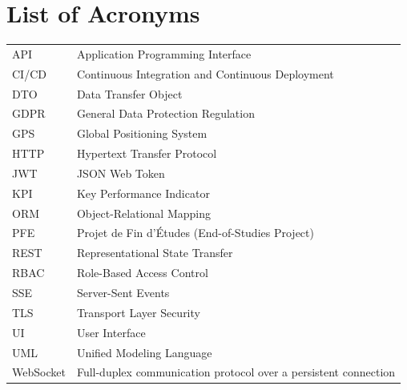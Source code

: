 \chapter*{List of Acronyms}
\begin{longtable}{P{2.7cm}P{11.5cm}}
API & Application Programming Interface\\
CI/CD & Continuous Integration and Continuous Deployment\\
DTO & Data Transfer Object\\
GDPR & General Data Protection Regulation\\
GPS & Global Positioning System\\
HTTP & Hypertext Transfer Protocol\\
JWT & JSON Web Token\\
KPI & Key Performance Indicator\\
ORM & Object-Relational Mapping\\
PFE & Projet de Fin d'Études (End-of-Studies Project)\\
REST & Representational State Transfer\\
RBAC & Role-Based Access Control\\
SSE & Server-Sent Events\\
TLS & Transport Layer Security\\
UI & User Interface\\
UML & Unified Modeling Language\\
WebSocket & Full-duplex communication protocol over a persistent connection\\
\end{longtable}


